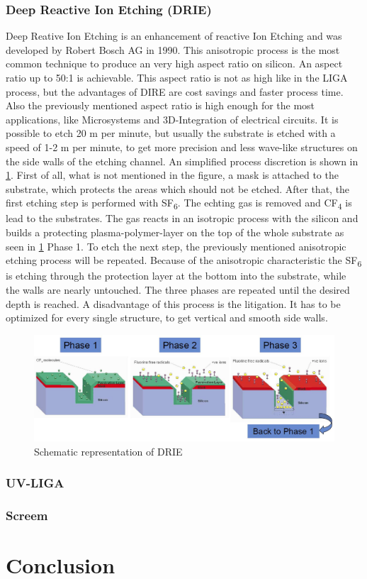 \documentclass[a4paper,
  twoside, %
  headlines=2.1 %
  ]{scrartcl}
\begin{document}
\subsubsection{Deep Reactive Ion Etching (DRIE) }
Deep Reative Ion Etching is an enhancement of reactive Ion Etching and was developed by Robert Bosch AG in 1990. This anisotropic process is the most common technique to produce an very high aspect ratio on silicon. An aspect ratio up to 50:1 is achievable. This aspect ratio is not as high like in the LIGA process, but the advantages of DIRE are cost savings and faster process time. Also the previously mentioned aspect ratio is high enough for the most applications, like  Microsystems and 3D-Integration of electrical circuits. It is possible to etch 20 \textmu m per minute, but usually the substrate is etched with a speed of 1-2 \textmu m per minute, to get more precision and less wave-like structures on the side walls of the etching channel. An simplified process discretion is shown in \cref{Schematic_drie}. First of all, what is not mentioned in the figure, a mask is attached to the substrate, which protects the areas which should not be etched. After that, the first etching step is performed with SF\textsubscript{6}. The echting gas is removed and CF\textsubscript{4} is lead to the substrates. The gas reacts in an isotropic process with the silicon and builds a protecting plasma-polymer-layer on the top of the whole substrate as seen in \cref{Schematic_drie} Phase 1. To etch the next step, the previously mentioned anisotropic etching process will be repeated. Because of the anisotropic characteristic the SF\textsubscript{6} is etching through the protection layer at the bottom into the substrate, while the walls are nearly untouched. The three phases are repeated until the desired depth is reached. A disadvantage of this process is the litigation. It has to be optimized for every single structure, to get vertical and smooth side walls\cite{menz2005paul}.

\begin{figure}[h]
	\centering
	\includegraphics[width=\textwidth]{Graphics/DIRE/drie-schema_fraunhofer.jpg}
	\caption{Schematic representation of DRIE \cite{Fraunhofer2019}}
	\centering
	\label{Schematic_drie}
\end{figure} 
\subsubsection{UV-LIGA}
\subsubsection{Screem}

\section{Conclusion}

\clearpage


\end{document}
